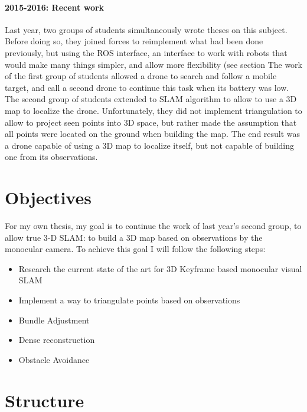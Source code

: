 \paragraph{2015-2016: Recent work}
Last year, two groups of students simultaneously wrote theses on this subject. Before doing so, they joined forces to reimplement what had been done previously, but using the ROS interface, an interface to work with robots that would make many things simpler, and allow more flexibility (see section %
The work of the first group of students allowed a drone to search and follow a mobile target, and call a second drone to continue this task when its battery was low.\\
The second group of students extended to SLAM algorithm to allow to use a 3D map to localize the drone. Unfortunately, they did not implement triangulation to allow to project seen points into 3D space, but rather made the assumption that all points were located on the ground when building the map. The end result was a drone capable of using a 3D map to localize itself, but not capable of building one from its observations.


\section{Objectives}
For my own thesis, my goal is to continue the work of last year's second group, to allow true 3-D SLAM: to build a 3D map based on observations by the monocular camera. To achieve this goal I will follow the following steps:
\begin{itemize}
\item Research the current state of the art for 3D Keyframe based monocular visual SLAM
\item Implement a way to triangulate points based on observations
\item Bundle Adjustment
\item Dense reconstruction
\item Obstacle Avoidance
\end{itemize}

\section{Structure}

